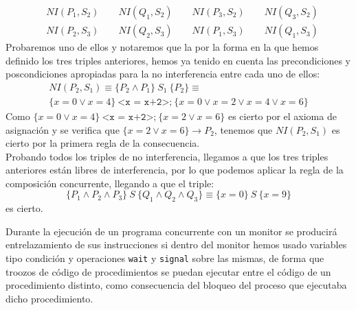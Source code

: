 \documentclass[12pt]{article}
\begin{document}
\begin{ejercicio}
\begin{align*}
            &NI(P_1, S_2) \qquad NI(Q_1, S_2) \qquad NI(P_3, S_2) \qquad NI(Q_3, S_2) \\
            &NI(P_2, S_3) \qquad NI(Q_2, S_3) \qquad NI(P_1, S_3) \qquad NI(Q_1, S_3) 
        \end{align*}
        Probaremos uno de ellos y notaremos que la por la forma en la que hemos definido los tres triples anteriores, hemos ya tenido en cuenta las precondiciones y poscondiciones apropiadas para la no interferencia entre cada uno de ellos:
        \begin{multline*}
            NI(P_2, S_1) \equiv \{P_2 \land P_1\}\ S_1\ \{P_2\} \equiv \\
            \{x=0 \lor x=4\}\ \texttt{<x = x+2>;}\ \{x=0 \lor x=2 \lor x=4 \lor x=6\} 
        \end{multline*}
        Como $\{x=0 \lor x=4\}\ \texttt{<x = x+2>;}\ \{x=2 \lor x=6\}$ es cierto por el axioma de asignación y se verifica que $\{x=2 \lor x=6\}\rightarrow P_2$, tenemos que $NI(P_2, S_1)$ es cierto por la primera regla de la consecuencia.\\

        Probando todos los triples de no interferencia, llegamos a que los tres triples anteriores están libres de interferencia, por lo que podemos aplicar la regla de la composición concurrente, llegando a que el triple:
        \begin{equation*}
        \{P_1 \land P_2 \land P_3\}\ S\ \{Q_1 \land Q_2 \land Q_3\} \equiv 
            \{x=0\}\ S\ \{x=9\}
        \end{equation*}
        es cierto.
    \end{ejercicio}

    \begin{ejercicio}
        Durante la ejecución de un programa concurrente con un monitor se producirá entrelazamiento de sus instrucciones si dentro del monitor hemos usado variables tipo condición y operaciones \verb|wait| y \verb|signal| sobre las mismas, de forma que troozos de código de procedimientos se puedan ejecutar entre el código de un procedimiento distinto, como consecuencia del bloqueo del proceso que ejecutaba dicho procedimiento.
    \end{ejercicio}
\end{document}
